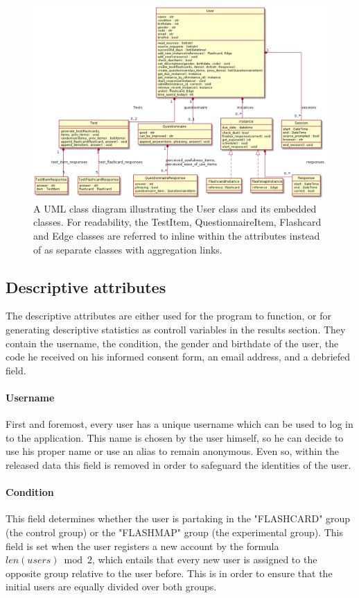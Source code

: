 \begin{figure}
    \centering
    \includegraphics[width=\textwidth]{img/classdiagram_user.png}
    \caption{A UML class diagram illustrating the User class and its embedded classes. For readability, the TestItem, QuestionnaireItem, Flashcard and Edge classes are referred to inline within the attributes instead of as separate classes with aggregation links.}
    \label{fig:classdiagram_user}
\end{figure}

\subsection{Descriptive attributes}

The descriptive attributes are either used for the program to function, or for generating descriptive statistics as controll variables in the results section. They contain the username, the condition, the gender and birthdate of the user, the code he received on his informed consent form, an email address, and a debriefed field.

\paragraph{Username} First and foremost, every user has a unique username which can be used to log in to the application. This name is chosen by the user himself, so he can decide to use his proper name or use an alias to remain anonymous. Even so, within the released data this field is removed in order to safeguard the identities of the user.

\paragraph{Condition} This field determines whether the user is partaking in the "FLASHCARD" group (the control group) or the "FLASHMAP" group (the experimental group). This field is set when the user registers a new account by the formula $len(users) \bmod 2$, which entails that every new user is assigned to the opposite group relative to the user before. This is in order to ensure that the initial users are equally divided over both groups.

